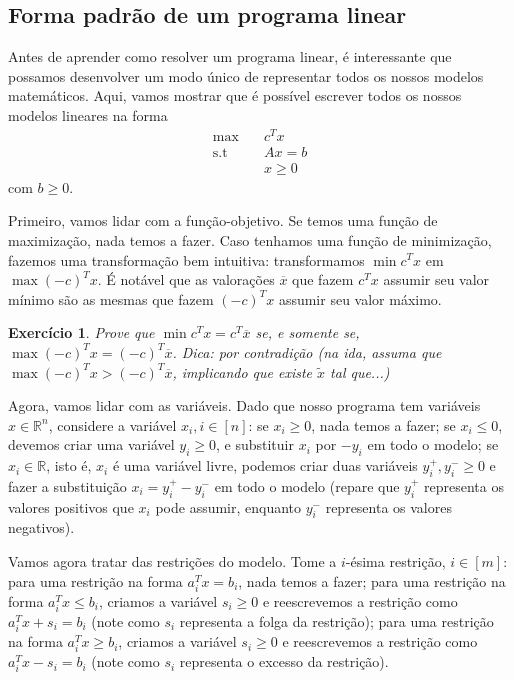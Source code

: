 \documentclass[]{article}
\newtheorem{exercicio}{Exercício}
\numberwithin{equation}{section}
\begin{document}
\subsection{Forma padrão de um programa linear}

Antes de aprender como resolver um programa linear, é interessante que possamos desenvolver um modo
único de representar todos os nossos modelos matemáticos.
Aqui, vamos mostrar que é possível escrever todos os nossos modelos lineares na forma
\begin{align}
\max        &\quad  c^Tx \\
\text{s.t}  &\quad  Ax = b \\
            &\quad  x \geq 0
\end{align}
com $b \geq 0$.

Primeiro, vamos lidar com a função-objetivo.
Se temos uma função de maximização, nada temos a fazer.
Caso tenhamos uma função de minimização, fazemos uma transformação bem intuitiva: transformamos
$\min c^Tx$ em $\max (-c)^Tx$.
É notável que as valorações $\overline{x}$ que fazem $c^Tx$ assumir seu valor mínimo são as mesmas
que fazem $(-c)^Tx$ assumir seu valor máximo.

\begin{exercicio}
  Prove que $\min c^Tx = c^T\overline{x}$ se, e somente se, $\max (-c)^Tx = (-c)^T\overline{x}$.
  Dica: por contradição (na ida, assuma que $\max (-c)^Tx > (-c)^T\overline{x}$, implicando que
  existe $\tilde{x}$ tal que...)
\end{exercicio}

Agora, vamos lidar com as variáveis.
Dado que nosso programa tem variáveis $x \in \mathbb{R}^n$, considere a variável $x_i, i \in [n]$:
se $x_i \geq 0$, nada temos a fazer; se $x_i \leq 0$, devemos criar uma variável $y_i \geq 0$, e
substituir $x_i$ por $-y_i$ em todo o modelo; se $x_i \in \mathbb{R}$, isto é, $x_i$ é uma variável
livre, podemos criar duas variáveis $y^+_i, y^-_i \geq 0$ e fazer a substituição
$x_i = y^+_i - y^-_i$ em todo o modelo (repare que $y^+_i$ representa os valores positivos que $x_i$
pode assumir, enquanto $y^-_i$ representa os valores negativos).

Vamos agora tratar das restrições do modelo. Tome a $i$-ésima restrição, $i \in [m]$: para uma
restrição na forma $a_i^Tx = b_i$, nada temos a fazer; para uma restrição na forma $a_i^Tx \leq b_i$,
criamos a variável $s_i \geq 0$ e reescrevemos a restrição como $a_i^Tx + s_i = b_i$ (note como
$s_i$ representa a folga da restrição); para uma restrição na forma $a_i^Tx \geq b_i$, criamos a
variável $s_i \geq 0$ e reescrevemos a restrição como $a_i^Tx - s_i = b_i$ (note como $s_i$
representa o excesso da restrição).
\end{document}
